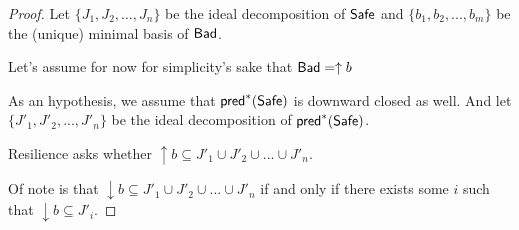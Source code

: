 \begin{proof}
Let $\{J_1, J_2,...,J_n\}$ be the ideal decomposition of $\textsf{Safe}$ and $\{b_1,b_2,...,b_m\}$ be the (unique) minimal basis of $\textsf{Bad}$.

Let's assume for now for simplicity's sake that $\textsf{Bad} = \uparrow b$ 

As an hypothesis, we assume that $\textsf{pred}^*(\textsf{Safe})$ is downward closed as well.
And let $\{J'_1, J'_2,...,J'_n\}$ be the ideal decomposition of $\textsf{pred}^*(\textsf{Safe})$.

Resilience asks whether 
$ \uparrow b \subseteq J'_1 \cup J'_2 \cup ... \cup J'_n$.

Of note is that $ \downarrow b \subseteq J'_1 \cup J'_2 \cup ... \cup J'_n$
if and only if
there exists some $i$ such that
$\downarrow b \subseteq J'_i$.

\end{proof}





